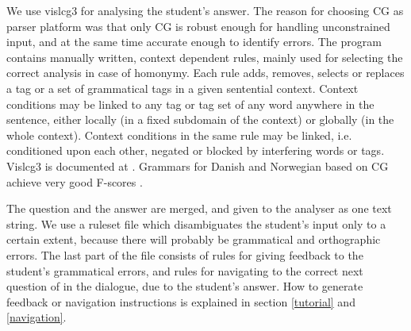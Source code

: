\documentclass[11pt]{article}
\begin{document}

We use vislcg3 for analysing the student's answer. The reason for choosing CG as parser platform was that only CG is robust enough for handling unconstrained input, and at the same time accurate enough to identify errors. The program contains manually written, context dependent rules, mainly used for selecting the correct analysis in case of homonymy. Each rule adds, removes, selects or replaces a tag or a set of grammatical tags in a given sentential context. Context conditions may be linked to any tag or tag set of any word anywhere in the sentence, either locally (in a fixed subdomain of the context) or globally (in the whole context). Context conditions in the same rule may be linked, i.e. conditioned upon each other, negated or blocked by interfering words or tags. Vislcg3 is documented at \cite{Visl:08}. Grammars for Danish and Norwegian based on CG achieve very good F-scores \cite{Bick:03}.

The question and the answer are merged, and given to the analyser as one text string. We use a ruleset file which disambiguates the student's input only to a certain extent, because there will probably be grammatical and orthographic errors. The last part of the file consists of rules for giving feedback to the student's grammatical errors, and rules for navigating to the correct next question of in the dialogue, due to the student's answer. How to generate feedback or navigation instructions is explained in section \ref{tutorial} and \ref{navigation}.
\end{document}
